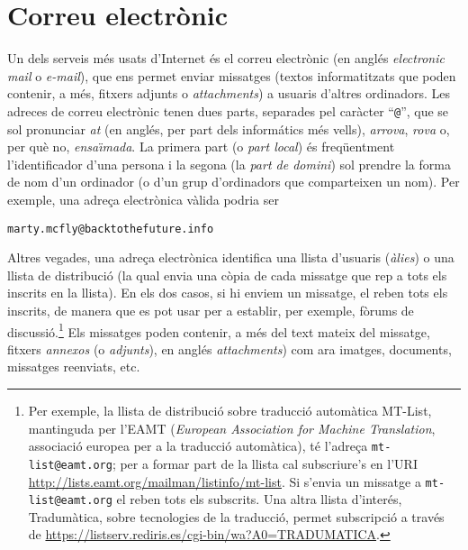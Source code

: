 \section{Correu electrònic}

Un dels serveis més usats d'Internet és el correu electrònic (en
anglés \emph{electronic mail} o \emph{e-mail}), que ens permet enviar
missatges (textos informatitzats que poden contenir, a més, fitxers
adjunts o \emph{attachments}) a usuaris d'altres ordinadors.  Les
adreces de correu electrònic tenen dues parts, separades pel caràcter
``{\tt @}'', que se sol pronunciar \emph{at} (en anglés, per part dels
informátics més vells), {\em arrova}, \emph{rova} o, per què no,
\emph{ensa\"{\i}mada}. La primera part (o \emph{part local}) és
freqüentment l'identificador d'una persona i la segona (la \emph{part
  de domini}) sol prendre la forma de nom d'un ordinador (o d'un grup
d'ordinadors que comparteixen un nom). Per exemple, una adreça
electrònica vàlida podria ser
\begin{center}
{\tt marty.mcfly@backtothefuture.info}
\end{center}
Altres vegades, una adreça electrònica identifica una llista
d'usuaris (\emph{àlies}) o una llista de distribució (la qual
envia una còpia de cada missatge que rep a tots els inscrits en la
llista). En els dos casos, si hi enviem un missatge, el reben tots els
inscrits, de manera que es pot usar per a establir, per exemple,
fòrums de discussió.\footnote{Per exemple, la llista de
  distribució sobre traducció automàtica MT-List, mantinguda per l'EAMT
  (\emph{European Association for Machine Translation}, associació
  europea per a la traducció automàtica), té l'adreça
  \texttt{mt-list@eamt.org}; per a formar part de la llista cal
  subscriure's en l'URI
  \url{http://lists.eamt.org/mailman/listinfo/mt-list}. Si
  s'envia un missatge a \texttt{mt-list@eamt.org} el reben tots els
  subscrits. Una altra llista d'interés, Tradumàtica, sobre tecnologies de la traducció, permet subscripció a través de \url{https://listserv.rediris.es/cgi-bin/wa?A0=TRADUMATICA}.}
  \label{pg:annex} Els missatges poden contenir, a més del text mateix
  del missatge, fitxers \emph{annexos} (o \emph{adjunts}), en anglés {\em
    attachments}) com ara imatges,  documents, missatges reenviats, etc.


